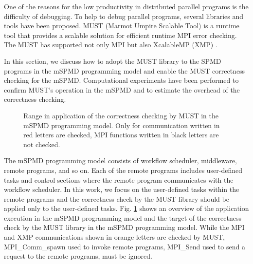 \documentclass[graybox]{svmult}
\begin{document}
One of the reasons for the low productivity in distributed parallel programs is the difficulty of debugging. 
To help to debug parallel programs, several libraries and tools have been proposed. 
MUST (Marmot Umpire Scalable Tool) \cite{MUST-project,Hilbrich2012must,Hilbrich2013must} is a runtime tool that provides a scalable solution for efficient runtime MPI error checking. The MUST has supported not only MPI but also XcalableMP (XMP) \cite{Protze2017a}. 

In this section, we discuss how to adopt the MUST library to the SPMD programs in the mSPMD programming model and enable the MUST correctness checking for the mSPMD.
Computational experiments have been performed to confirm MUST's operation in the mSPMD and to estimate the overhead of the correctness checking.

\begin{figure}[t]
 \begin{center}
\caption{
Range in application of the correctness checking by MUST in the mSPMD programming model. 
Only for communication written in red letters are checked, MPI functions written in black letters are not checked.
}
\label{fig:must-target}
 \end{center}
\end{figure}

The mSPMD programming model consists of workflow scheduler, middleware, remote programs, and so on. 
Each of the remote programs includes user-defined tasks and control sections where the remote program communicates with the workflow scheduler. 
In this work, we focus on the user-defined tasks within the remote programs and the correctness check by the MUST library should be applied only to the user-defined tasks. Fig. \ref{fig:must-target} shows an overview of the application execution in the mSPMD programming model and the target of the correctness check by the MUST library in the mSPMD programming model. While the MPI and XMP communications shown in orange letters are checked by MUST, MPI\_Comm\_spawn used to invoke remote programs, MPI\_Send used to send a request to the remote programs, must be ignored. 
\end{document}

